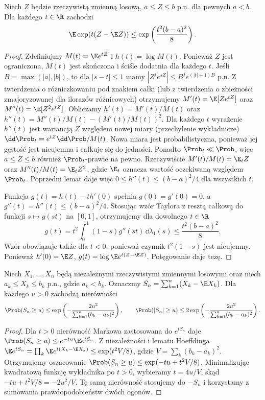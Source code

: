 \begin{lemat}
Niech $Z$ będzie rzeczywistą zmienną losową,
$a\leq Z\leq b$ p.n. dla pewnych $a<b$.
Dla każdego $t\in\R$ zachodzi
\[
\E\exp(t(Z-\E Z))
\leq\exp\left(\frac{t^2(b-a)^2}{8}\right).
\]
\end{lemat}
\begin{proof}
Zdefiniujmy $M(t)=\E e^{tZ}$ i
$h(t)=\log M(t)$. Ponieważ $Z$ jest ograniczona, $M(t)$ jest skończona
i ściśle dodatnia dla każdego $t$. Jeśli
$B=\max(|a|,|b|)$, to dla $|s-t|\leq1$ mamy
$|Z^j e^{sZ}|\leq B^j e^{(|t|+1)B}$ p.n.
Z twierdzenia o różniczkowaniu pod znakiem całki
(lub z twierdzenia o zbieżności zmajoryzowanej
dla ilorazów różnicowych) otrzymujemy
$M'(t)=\E[Ze^{tZ}]$ oraz $M''(t)=\E[Z^2e^{tZ}]$. Obliczamy
$h'(t)=M'(t)/M(t)$ oraz
$h''(t)=M''(t)/M(t)-(M'(t)/M(t))^2$.
Dla każdego $t$ wyrażenie $h''(t)$ jest
wariancją $Z$ względem nowej miary (przechylenie wykładnicze)
$\dd\Prob_t=e^{tZ}\dd\Prob/M(t)$. Nowa miara jest
probabilistyczna, ponieważ jej gęstość jest nieujemna
i całkuje się do jedności. Ponadto $\Prob_t\ll\Prob$,
więc $a\leq Z\leq b$ również $\Prob_t$-prawie na pewno.
Rzeczywiście $M'(t)/M(t)=\E_t Z$ oraz
$M''(t)/M(t)=\E_t Z^2$, gdzie $\E_t$ oznacza
wartość oczekiwaną względem $\Prob_t$.
Poprzedni lemat daje więc
$0\leq h''(t)\leq(b-a)^2/4$ dla wszystkich $t$.

Funkcja $g(t)=h(t)-th'(0)$ spełnia $g(0)=g'(0)=0$,
a $g''(t)=h''(t)\leq(b-a)^2/4$.
Stosując wzór Taylora z resztą całkową do funkcji
$s\mapsto g(st)$ na $[0,1]$, otrzymujemy dla
dowolnego $t\in\R$
\[
g(t)=t^2\int_0^1(1-s)g''(st)\,\dd\lambda_1(s)
\leq \frac{t^2(b-a)^2}{8}.
\]
Wzór obowiązuje także dla $t<0$, ponieważ czynnik
$t^2(1-s)$ jest nieujemny.
Ponieważ $h'(0)=\E Z$,
$g(t)=\log\E e^{t(Z-\E Z)}$.
Potęgowanie daje tezę.
\end{proof}

\begin{twierdzenie}
Niech $X_1,\ldots,X_n$ będą niezależnymi rzeczywistymi
zmiennymi losowymi oraz niech $a_k\leq X_k\leq b_k$
p.n., gdzie $a_k<b_k$. Oznaczmy
$S_n=\sum_{k=1}^n(X_k-\E X_k)$.
Dla każdego $u>0$ zachodzą nierówności
\[
\Prob(S_n\geq u)\leq
\exp\left(-\frac{2u^2}{\sum_{k=1}^n(b_k-a_k)^2}\right),
\qquad
\Prob(|S_n|\geq u)\leq
2\exp\left(-\frac{2u^2}{\sum_{k=1}^n(b_k-a_k)^2}\right).
\]
\end{twierdzenie}
\begin{proof}
Dla $t>0$ nierówność Markowa zastosowana
do $e^{tS_n}$ daje
$\Prob(S_n\geq u)\leq e^{-tu}\E e^{tS_n}$.
Z niezależności i lematu Hoeffdinga
$\E e^{tS_n}=\prod_k\E e^{t(X_k-\E X_k)}
\leq\exp(t^2V/8)$,
gdzie $V=\sum_k(b_k-a_k)^2$.
Otrzymujemy oszacowanie
$\Prob(S_n\geq u)\leq\exp(-tu+t^2V/8)$.
Minimalizując kwadratową funkcję wykładnika po $t>0$,
wybieramy $t=4u/V$, skąd $-tu+t^2V/8=-2u^2/V$.
Tę samą nierówność stosujemy do $-S_n$ i korzystamy
z sumowania prawdopodobieństw dwóch ogonów.
\end{proof}

